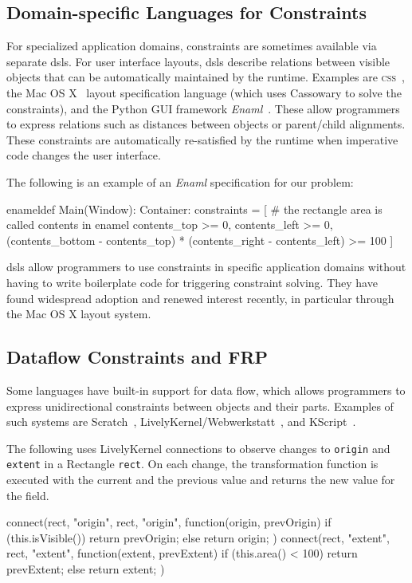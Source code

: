 \subsection{Domain-specific Languages for Constraints}

For specialized application domains, constraints are sometimes
available via separate \acp{dsl}. For user interface layouts, \acp{dsl}
describe relations between visible objects that can be automatically
maintained by the runtime.  Examples are
\textsc{css}~\cite{lie-css-book}, the Mac OS
X~\cite{AppleCocoaAutoLayout} layout specification language (which
uses Cassowary to solve the constraints), and the Python GUI framework
\emph{Enaml}~\cite{Enaml}. These allow programmers to express
relations such as distances between objects or parent/child
alignments. These constraints are automatically re-satisfied by the
runtime when imperative code changes the user interface.

The following is an example of an \emph{Enaml} specification for our
problem:
\begin{code}[language=python]
enameldef Main(Window):
    Container:
        constraints = [
            # the rectangle area is called contents in enamel
            contents_top >= 0, contents_left >= 0,
            (contents_bottom - contents_top) *
              (contents_right - contents_left) >= 100
        ]
\end{code}

\DIFdelbegin %
\DIFdelend \DIFaddbegin \acp{dsl} \DIFaddend allow programmers to use constraints in specific application
domains without having to write boilerplate code for triggering
constraint solving. They have found widespread adoption and renewed
interest recently, in particular through the Mac OS X layout system.

\subsection{Dataflow Constraints and FRP}

Some languages have built-in support for data flow, which allows
programmers to express unidirectional constraints between objects and
their parts. Examples of such systems are
Scratch~\cite{resnick2009scratch},
LivelyKernel/Webwerkstatt~\cite{lincke2012lively}, and
KScript~\cite{ohshima2013onward}.

The following uses LivelyKernel connections to observe changes to
\texttt{origin} and \texttt{extent} in a Rectangle \texttt{rect}.  On
each change, the transformation function is executed with the current
and the previous value and returns the new value for the field.
\begin{code}[language=java]
connect(rect, "origin", rect, "origin",
        function(origin, prevOrigin) {
            if (\DIFaddbegin \DIFadd{!}\DIFaddend this.isVisible()) return prevOrigin;
            else return origin;
        })
connect(rect, "extent", rect, "extent",
        function(extent, prevExtent) {
            if (this.area() < 100) return prevExtent;
            else return extent;
        })
\end{code}

